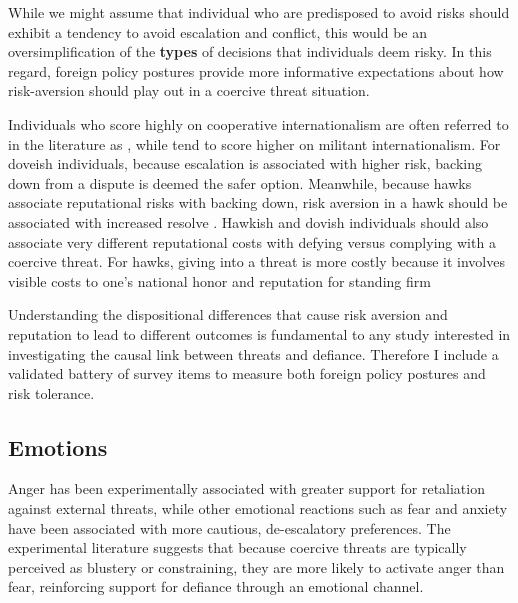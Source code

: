 While we might assume that individual who are predisposed to avoid risks should exhibit a tendency to avoid escalation and conflict, this would be an oversimplification of the \textbf{types} of decisions that individuals deem risky. In this regard, foreign policy postures provide more informative expectations about how risk-aversion should play out in a coercive threat situation. 

Individuals who score highly on cooperative internationalism are often referred to in the literature as , while  tend to score higher on militant internationalism.\autocite{wittkopf_foreign_1986, rathbun_taking_2016, brutger_dispositional_2018} For doveish individuals, because escalation is associated with higher risk, backing down from a dispute is deemed the safer option.\autocite{kertzer_resolve_2017, brutger_dispositional_2018} Meanwhile, because hawks associate reputational risks with backing down, risk aversion in a hawk should be associated with increased resolve \autocite{kertzer_resolve_2017, brutger_dispositional_2018}. Hawkish and dovish individuals should also associate very different reputational costs with defying versus complying with a coercive threat. For hawks, giving into a threat is more costly because it involves visible costs to one's national honor and reputation for standing firm \autocite{kertzer_resolve_2017, brutger_dispositional_2018, lupton_reputation_2020, dafoe_reputations_2021} 

Understanding the dispositional differences that cause risk aversion and reputation to lead to different outcomes is fundamental to any study interested in investigating the causal link between threats and defiance. Therefore I include a validated battery of survey items to measure both foreign policy postures and risk tolerance. \autocite{gravelle_structure_2017, kertzer_resolve_2016, vieider_common_2015}


\subsection{Emotions}
Anger has been experimentally associated with greater support for retaliation against external threats,\autocite{shandler_cyber_2021, fisk_emotions_2019} while other emotional reactions such as fear and anxiety have been associated with more cautious, de-escalatory preferences.\autocite{huddy_threat_2005, wagner_anxiety_2019} The experimental literature suggests that because coercive threats are typically perceived as blustery or constraining, they are more likely to activate anger than fear, reinforcing support for defiance through an emotional channel.

